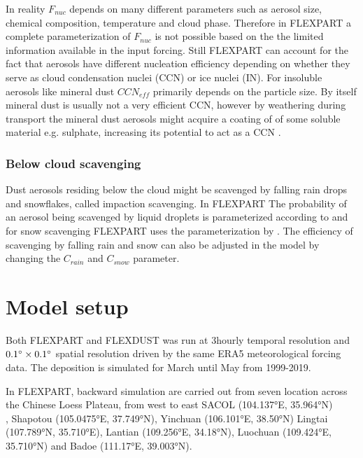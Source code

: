 In reality $F_{nuc}$ depends on many different parameters such as aerosol size, chemical composition, temperature and cloud phase. Therefore in FLEXPART a complete parameterization of $F_{nuc}$ is not possible based on the the limited information available in the input forcing. Still FLEXPART can account for the fact that aerosols have different nucleation efficiency depending on whether they serve as cloud condensation nuclei (CCN) or ice nuclei (IN). For insoluble aerosols like mineral dust $CCN_{eff}$ primarily depends on the particle size. By itself mineral dust is usually not a very efficient CCN, however by weathering during transport the mineral dust aerosols might acquire a coating of of some soluble material e.g. sulphate, increasing its potential to act as a CCN \textcite{Dust_aerosols_coating2001}.     

\subsubsection{Below cloud scavenging}
Dust aerosols residing below the cloud might be scavenged by falling rain drops and snowflakes, called impaction scavenging. In FLEXPART The probability of an aerosol being scavenged by liquid droplets is parameterized according to \textcite{laakso2003ultrafine} and for snow scavenging FLEXPART uses the parameterization by \textcite{kyro2009snow}. The efficiency of scavenging by falling rain and snow can also be adjusted in the model by changing the $C_{rain}$ and $C_{snow}$ parameter.   


\section{Model setup}\label{sec:Model_setup}
Both FLEXPART and FLEXDUST was run at 3hourly temporal resolution and $0.1\degree \times 0.1\degree$ spatial resolution driven by the same ERA5 meteorological forcing data. The deposition is simulated for March until May from 1999-2019. 

In FLEXPART, backward simulation are carried out from seven location across the Chinese Loess Plateau, from west to east SACOL (\ang{104.137}E,  \ang{35.964}N)\\, Shapotou (\ang{105.0475}E,  \ang{37.749}N), Yinchuan (\ang{106.101}E, \ang{38.50}N) Lingtai \\ (\ang{107.789}N,  \ang{35.710}E), Lantian (\ang{109.256}E, \ang{34.18}N), Luochuan (\ang{109.424}E, \\  \ang{35.710}N) and  Badoe (\ang{111.17}E, \ang{39.003}N).

